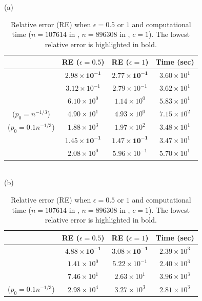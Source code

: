 \begin{table}[t]
  \caption{Relative error (RE) when $\epsilon=0.5$ or $1$ and computational time ($n=107614$ in \Gplus{}, $n=896308$ in \IMDB{}, $c=1$). 
  The lowest relative error is highlighted in bold.
  }
  \vspace{-4mm}
  \centering
  (a) \Gplus{}\\
  \begin{tabular}{|c|c|c|c|}
    \hline
    & RE ($\epsilon=0.5$) & RE ($\epsilon=1$) & Time (sec)\\ \hline
    \AlgWSTriVR{} & $\bm{2.98 \times 10^{-1}}$ & $\bm{2.77 \times 10^{-1}}$ & $3.60 \times 10^1$ \\ \hline
    \AlgWSTri{} & $3.12 \times 10^{-1}$ & $2.79 \times 10^{-1}$ & $3.62 \times 10^1$ \\ \hline
    \AlgWLTri{} & $6.10 \times 10^0$ & $1.14 \times 10^0$ & $5.83 \times 10^1$ \\ \hline
    \AlgARRTri{} ($p_0=n^{-1/3}$) & $4.90 \times 10^1$ & $4.93 \times 10^0$ & $7.15 \times 10^2$ \\ \hline
    \hspace{-0.5mm}\AlgARRTri{} ($p_0=0.1n^{-1/3}$)\hspace{-0.5mm} & $1.88 \times 10^3$ & $1.97 \times 10^2$ & $3.48 \times 10^1$ \\ \hline \hline
    \AlgWSCyc{} & $\bm{1.45 \times 10^{-1}}$ & $\bm{1.47 \times 10^{-1}}$ & $3.47 \times 10^1$ \\ \hline
    \AlgWLCyc{} & $2.08 \times 10^0$ & $5.96 \times 10^{-1}$ & $5.70 \times 10^1$ \\ \hline
  \end{tabular}\\
  (b) \IMDB{}\\
  \begin{tabular}{|c|c|c|c|}
    \hline
    & RE ($\epsilon=0.5$) & RE ($\epsilon=1$) & Time (sec)\\ \hline
    \AlgWSTriVR{} & $\bm{4.88 \times 10^{-1}}$ & $\bm{3.08 \times 10^{-1}}$ & $2.39 \times 10^3$ \\ \hline
    \AlgWSTri{} & $1.41 \times 10^0$ & $5.22 \times 10^{-1}$ & $2.40 \times 10^3$ \\ \hline
    \AlgWLTri{} & $7.46 \times 10^1$ & $2.63 \times 10^1$ & $3.96 \times 10^3$ \\ \hline
    \hspace{-0.5mm}\AlgARRTri{} ($p_0=0.1n^{-1/3}$)\hspace{-0.5mm} & $2.98 \times 10^4$ & $3.27 \times 10^3$ & $2.81 \times 10^3$ \\ \hline \hline

\end{tabular}
\end{table}
